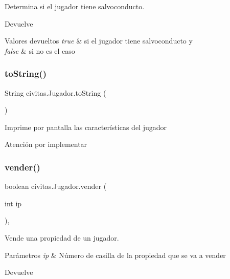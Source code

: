 Determina si el jugador tiene salvoconducto. \begin{DoxyReturn}{Devuelve}

\end{DoxyReturn}

\begin{DoxyRetVals}{Valores devueltos}
{\em true} & si el jugador tiene salvoconducto y \\
\hline
{\em false} & si no es el caso \\
\hline
\end{DoxyRetVals}
\mbox{\label{classcivitas_1_1Jugador_a102b4070dfc271c865fcd6ebe92d9c06}} 
\subsubsection{\texorpdfstring{to\+String()}{toString()}}
{\footnotesize\ttfamily String civitas.\+Jugador.\+to\+String (\begin{DoxyParamCaption}{ }\end{DoxyParamCaption})\hspace{0.3cm}{\ttfamily [inline]}}

Imprime por pantalla las características del jugador \begin{DoxyWarning}{Atención}
por implementar 
\end{DoxyWarning}
\mbox{\label{classcivitas_1_1Jugador_aa9a90b759adaccfd58e322c5518bb0f9}} 
\subsubsection{\texorpdfstring{vender()}{vender()}}
{\footnotesize\ttfamily boolean civitas.\+Jugador.\+vender (\begin{DoxyParamCaption}\item[{int}]{ip }\end{DoxyParamCaption})\hspace{0.3cm}{\ttfamily [inline]}, {\ttfamily [package]}}

Vende una propiedad de un jugador. 
\begin{DoxyParams}{Parámetros}
{\em ip} & Número de casilla de la propiedad que se va a vender \\
\hline
\end{DoxyParams}
\begin{DoxyReturn}{Devuelve}

\end{DoxyReturn}

